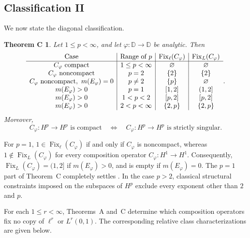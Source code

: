 \documentclass[11pt, reqno]{amsart}
\newtheorem*{theoremC}{Theorem C}
\theoremstyle{definition}
\theoremstyle{remark}
\newcommand{\D}{\mathbb{D}}
\begin{document}
\subsection*{Classification II}  We now state the diagonal classification.

\begin{theoremC}\label{thm:C}
Let \(1\le p<\infty\), and let \(\varphi:\D\to\D\) be analytic. Then
\[
\begin{array}{c|c|c|c}
\textup{Case}
& \textup{Range of }p
& \operatorname{Fix}_{\ell}(C_\varphi)
& \operatorname{Fix}_{L}(C_\varphi)\\
\hline
C_\varphi\textup{ compact}
& 1\le p<\infty
& \varnothing
& \varnothing\\
C_\varphi\textup{ noncompact}
& p=2
& \{2\}
& \{2\}\\
C_\varphi\textup{ noncompact},\ m(E_\varphi)=0
& p\ne2
& \{p\}
& \varnothing\\
m(E_\varphi)>0
& p=1
& [1,2]
& (1,2]\\
m(E_\varphi)>0
& 1<p<2
& [p,2]
& [p,2]\\
m(E_\varphi)>0
& 2<p<\infty
& \{2,p\}
& \{2,p\}
\end{array}.
\]
Moreover,
\[
        C_\varphi:H^p\to H^p\text{ is compact}
        \quad\Longleftrightarrow\quad
        C_\varphi:H^p\to H^p\text{ is strictly singular}.
\]
\end{theoremC}

For \(p=1\),
\(1\in\operatorname{Fix}_{\ell}(C_\varphi)\) if and only if
\(C_\varphi\) is noncompact, whereas
\(1\notin\operatorname{Fix}_{L}(C_\varphi)\) for every composition
operator \(C_\varphi:H^1\to H^1\). Consequently,
\(\operatorname{Fix}_{L}(C_\varphi)=(1,2]\) if
\(m(E_\varphi)>0\), and is empty if \(m(E_\varphi)=0\). The \(p=1\) part of Theorem~C completely settles
\cite[Problem~4.3(2)]{LNST2017}. In the case \(p>2\), classical structural constraints imposed on the subspaces of \(H^p\)  exclude every exponent other than
\(2\) and \(p\).

For each \(1\le r<\infty\), Theorems~A and~C determine which
composition operators fix no copy of \(\ell^r\) or \(L^r(0,1)\).
The corresponding relative class characterizations are given below.
\end{document}
